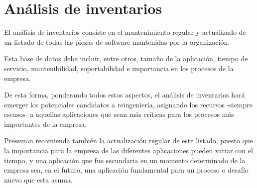 \section{Análisis de inventarios}

El análisis de inventarios consiste en el mantenimiento regular y 
actualizado de un listado de todas las piezas de software mantenidas por la 
organización.

Esta base de datos debe incluir, entre otros, tamaño de la aplicación,
tiempo de servicio, mantenibilidad, soportabilidad 
e importancia en los procesos de la empresa.

De esta forma, ponderando todos estos aspectos,
el análisis de inventarios hará emerger los potenciales candidatos a 
reingeniería, asignando los recursos -siempre escasos-
a aquellas aplicaciones que sean más críticas para los procesos más importantes 
de la empresa.

Pressman recomienda también la actualización regular de este listado,
puesto que la importancia para la empresa de las diferentes aplicaciones 
pueden variar con el tiempo,
y una aplicación que fue secundaria en un momento determinado de la empresa sea,
en el futuro,
una aplicación fundamental para un proceso o desafío nuevo que esta asuma.